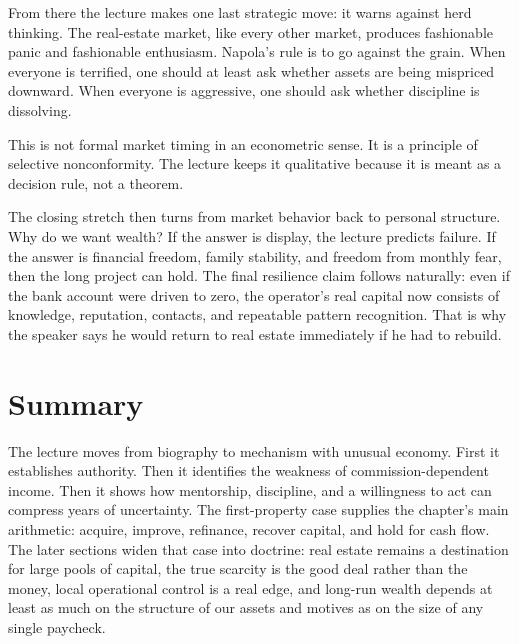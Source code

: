 From there the lecture makes one last strategic move: it warns against herd thinking. The real-estate market, like every other market, produces fashionable panic and fashionable enthusiasm. Napola's rule is to go against the grain. When everyone is terrified, one should at least ask whether assets are being mispriced downward. When everyone is aggressive, one should ask whether discipline is dissolving.

This is not formal market timing in an econometric sense. It is a principle of selective nonconformity. The lecture keeps it qualitative because it is meant as a decision rule, not a theorem.

The closing stretch then turns from market behavior back to personal structure. Why do we want wealth? If the answer is display, the lecture predicts failure. If the answer is financial freedom, family stability, and freedom from monthly fear, then the long project can hold. The final resilience claim follows naturally: even if the bank account were driven to zero, the operator's real capital now consists of knowledge, reputation, contacts, and repeatable pattern recognition. That is why the speaker says he would return to real estate immediately if he had to rebuild.

\section{Summary}

The lecture moves from biography to mechanism with unusual economy. First it establishes authority. Then it identifies the weakness of commission-dependent income. Then it shows how mentorship, discipline, and a willingness to act can compress years of uncertainty. The first-property case supplies the chapter's main arithmetic: acquire, improve, refinance, recover capital, and hold for cash flow. The later sections widen that case into doctrine: real estate remains a destination for large pools of capital, the true scarcity is the good deal rather than the money, local operational control is a real edge, and long-run wealth depends at least as much on the structure of our assets and motives as on the size of any single paycheck.